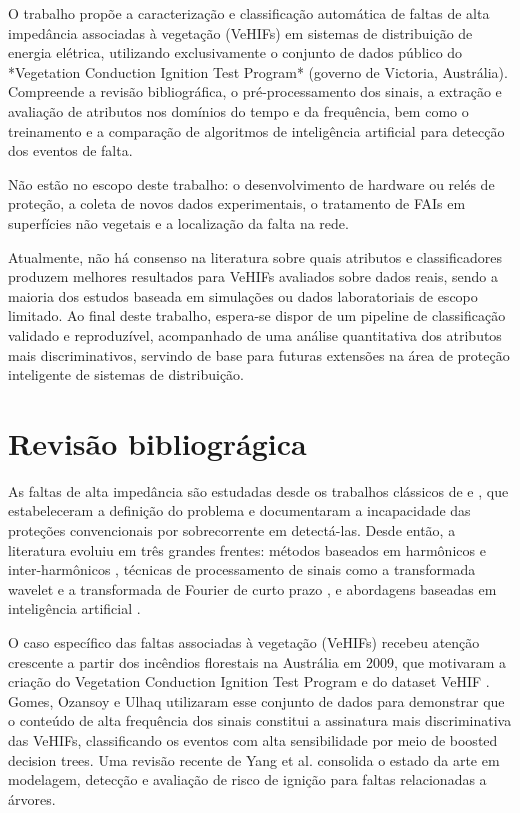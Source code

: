 O trabalho propõe a caracterização e classificação automática de faltas de alta impedância associadas à vegetação (VeHIFs) em sistemas de distribuição de energia elétrica, utilizando exclusivamente o conjunto de dados público do *Vegetation Conduction Ignition Test Program* (governo de Victoria, Austrália). Compreende a revisão bibliográfica, o pré-processamento dos sinais, a extração e avaliação de atributos nos domínios do tempo e da frequência, bem como o treinamento e a comparação de algoritmos de inteligência artificial para detecção dos eventos de falta.

Não estão no escopo deste trabalho: o desenvolvimento de hardware ou relés de proteção, a coleta de novos dados experimentais, o tratamento de FAIs em superfícies não vegetais e a localização da falta na rede.

Atualmente, não há consenso na literatura sobre quais atributos e classificadores produzem melhores resultados para VeHIFs avaliados sobre dados reais, sendo a maioria dos estudos baseada em simulações ou dados laboratoriais de escopo limitado. Ao final deste trabalho, espera-se dispor de um pipeline de classificação validado e reproduzível, acompanhado de uma análise quantitativa dos atributos mais discriminativos, servindo de base para futuras extensões na área de proteção inteligente de sistemas de distribuição.


\section{Revisão bibliográgica}

As faltas de alta impedância são estudadas desde os trabalhos clássicos de  e , que estabeleceram a definição do problema e documentaram a incapacidade das proteções convencionais por sobrecorrente em detectá-las. Desde então, a literatura evoluiu em três grandes frentes: métodos baseados em harmônicos e inter-harmônicos \cite{3,4}, técnicas de processamento de sinais como a transformada wavelet e a transformada de Fourier de curto prazo \cite{5,6,7}, e abordagens baseadas em inteligência artificial \cite{8}.

O caso específico das faltas associadas à vegetação (VeHIFs) recebeu atenção crescente a partir dos incêndios florestais na Austrália em 2009, que motivaram a criação do Vegetation Conduction Ignition Test Program e do dataset VeHIF \cite{vic_bushfire_report}. Gomes, Ozansoy e Ulhaq  utilizaram esse conjunto de dados para demonstrar que o conteúdo de alta frequência dos sinais constitui a assinatura mais discriminativa das VeHIFs, classificando os eventos com alta sensibilidade por meio de boosted decision trees. Uma revisão recente de Yang et al.  consolida o estado da arte em modelagem, detecção e avaliação de risco de ignição para faltas relacionadas a árvores.

